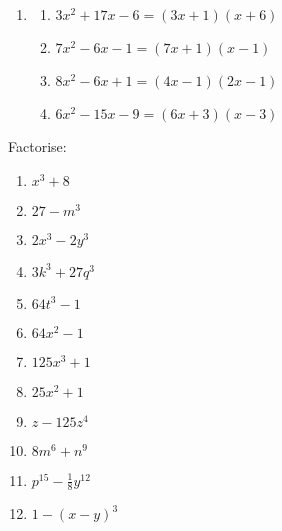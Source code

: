 \begin{solutions}{}
{\begin{enumerate}[itemsep=5pt, label=\textbf{\arabic*}. ]
\begin{multicols}{2}
\begin{enumerate}[itemsep=2pt, label=\textbf{(\alph*)} ]
\item $3{x}^{2}+19x+6=(3x + 1)(x + 6)$%
\item $6{x}^{2}+7x+2=(6x + 1)(x + 1)$%
\item $12{x}^{2}+8x+1=(6x + 1)(2x + 1)$%
\item $8{x}^{2}+6x+1=(2x + 1)(4x + 1)$%
\end{enumerate}
\end{multicols}

\item %
\begin{multicols}{2}
\begin{enumerate}[itemsep=2pt, label=\textbf{(\alph*)} ] 
\item $3{x}^{2}+17x-6=(3x + 1)(x + 6)$%
\item $7{x}^{2}-6x-1=(7x + 1)(x - 1)$%
\item $8{x}^{2}-6x+1=(4x - 1)(2x - 1)$%
\item $6{x}^{2}-15x-9=(6x + 3)(x - 3)$%
\end{enumerate}
\end{multicols}
\end{enumerate}

}
\end{solutions}
\begin{exercises}{}
{
Factorise:
\begin{multicols}{2}
\begin{enumerate}[itemsep=2pt, label=\textbf{\arabic*}. ] 
\item ${x}^{3}+8$
\item $27-m^{3}$
\item $2x^{3}-2y^{3}$
\item $3k^{3} + 27q^{3}$
\item $64t^{3}-1$
\item $64x^{2} -1$
\item $125x^{3} +1$
\item $25x^{2} +1$
\item $z-125z^4{}$
\item $8m^{6} + n^{9}$
\item $p^{15} - \frac{1}{8}y^{12}$
\item $1- (x-y)^3$
\end{enumerate}
\end{multicols}

}
\end{exercises}


